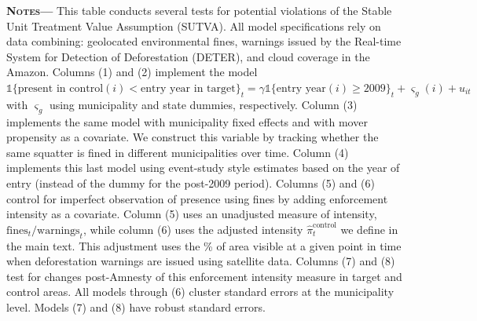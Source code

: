 \documentclass[12pt]{article}
\begin{document}
\begin{center}
\begin{threeparttable}[b]
\begin{tablenotes}[flushleft]
   \item {\justify\singlespacing\footnotesize {\textsc{\textbf{Notes---}}} This table conducts several tests for potential violations of the Stable Unit Treatment Value Assumption (SUTVA). All model specifications rely on data combining: geolocated environmental fines, warnings issued by the Real-time System for Detection of Deforestation (DETER), and cloud coverage in the Amazon. Columns (1) and (2) implement the model $\mathbb{1}\{\text{present in control}(i) < \text{entry year in target} \}_t = \gamma \mathbb{1}\{\text{entry year}(i) \geq 2009 \}_t+\varsigma_g(i)+u_{it}$ with $\varsigma_g$ using municipality and state dummies, respectively. Column (3) implements the same model with municipality fixed effects and with mover propensity as a covariate. We construct this variable by tracking whether the same squatter is fined in different municipalities over time. Column (4) implements this last model using event-study style estimates based on the year of entry (instead of the dummy for the post-2009 period). Columns (5) and (6) control for imperfect observation of presence using fines by adding enforcement intensity as a covariate. Column (5) uses an unadjusted measure of intensity, $\text{fines}_t/\text{warnings}_t$, while column (6) uses the adjusted intensity $\widehat{\pi}_t^\text{control}$ we define in the main text. This adjustment uses the \% of area visible at a given point in time when deforestation warnings are issued using satellite data. Columns (7) and (8) test for changes post-Amnesty of this enforcement intensity measure in target and control areas. All models through (6) cluster standard errors at the municipality level. Models (7) and (8) have robust standard errors.}
    \end{tablenotes}
     \label{tab:3}
\end{threeparttable}
\end{center}


\clearpage
\end{document}
